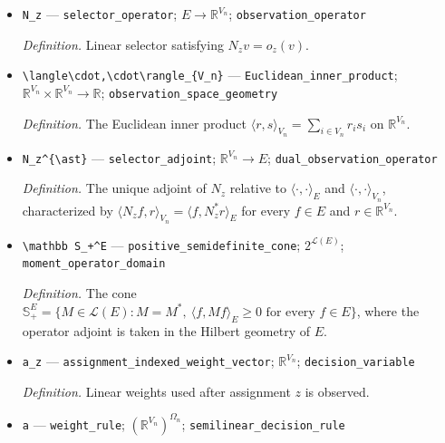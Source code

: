 \documentclass{article}
\begin{document}
\begin{itemize}
  \item \texttt{N\_\allowbreak{}z} --- \texttt{selector\_\allowbreak{}operator}; \(E\to\mathbb R^{V_n}\); \texttt{observation\_\allowbreak{}operator}
  \par\smallskip\noindent\emph{Definition.} Linear selector satisfying \(N_zv=o_z(v)\).
  \item \texttt{\textbackslash{}\allowbreak{}langle\textbackslash{}\allowbreak{}cdot,\allowbreak{}\textbackslash{}\allowbreak{}cdot\textbackslash{}\allowbreak{}rangle\_\allowbreak{}\{V\_\allowbreak{}n\}\allowbreak{}} --- \texttt{Euclidean\_\allowbreak{}inner\_\allowbreak{}product}; \(\mathbb R^{V_n}\times\mathbb R^{V_n}\to\mathbb R\); \texttt{observation\_\allowbreak{}space\_\allowbreak{}geometry}
  \par\smallskip\noindent\emph{Definition.} The Euclidean inner product \(\langle r,s\rangle_{V_n}=\sum_{i\in V_n}r_is_i\) on \(\mathbb R^{V_n}\).
  \item \texttt{N\_\allowbreak{}z\textasciicircum{}\{\textbackslash{}\allowbreak{}ast\}\allowbreak{}} --- \texttt{selector\_\allowbreak{}adjoint}; \(\mathbb R^{V_n}\to E\); \texttt{dual\_\allowbreak{}observation\_\allowbreak{}operator}
  \par\smallskip\noindent\emph{Definition.} The unique adjoint of \(N_z\) relative to \(\langle\cdot,\cdot\rangle_E\) and \(\langle\cdot,\cdot\rangle_{V_n}\), characterized by \(\langle N_zf,r\rangle_{V_n}=\langle f,N_z^{\ast}r\rangle_E\) for every \(f\in E\) and \(r\in\mathbb R^{V_n}\).
  \item \texttt{\textbackslash{}\allowbreak{}mathbb S\_\allowbreak{}+\allowbreak{}\textasciicircum{}E} --- \texttt{positive\_\allowbreak{}semidefinite\_\allowbreak{}cone}; \(2^{\mathcal L(E)}\); \texttt{moment\_\allowbreak{}operator\_\allowbreak{}domain}
  \par\smallskip\noindent\emph{Definition.} The cone \(\mathbb S_+^E=\{M\in\mathcal L(E):M=M^{\ast},\ \langle f,Mf\rangle_E\ge0\text{ for every }f\in E\}\), where the operator adjoint is taken in the Hilbert geometry of \(E\).
  \item \texttt{a\_\allowbreak{}z} --- \texttt{assignment\_\allowbreak{}indexed\_\allowbreak{}weight\_\allowbreak{}vector}; \(\mathbb R^{V_n}\); \texttt{decision\_\allowbreak{}variable}
  \par\smallskip\noindent\emph{Definition.} Linear weights used after assignment \(z\) is observed.
  \item \texttt{a} --- \texttt{weight\_\allowbreak{}rule}; \((\mathbb R^{V_n})^{\Omega_n}\); \texttt{semilinear\_\allowbreak{}decision\_\allowbreak{}rule}

\end{itemize}
\end{document}
